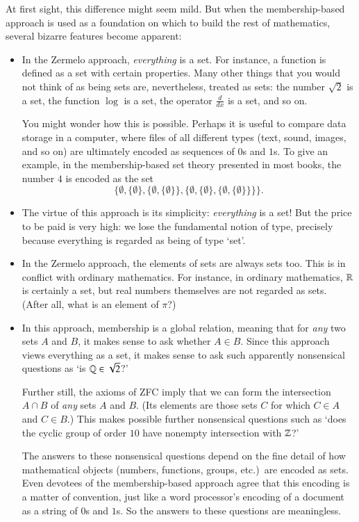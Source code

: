 At first sight, this difference might seem mild.  But when the
membership-based approach is used as a foundation on which to build the
rest of mathematics, several bizarre features become apparent:
%
\begin{itemize}
\item
In the Zermelo approach, \emph{everything} is a set.  For instance, a
function is defined as a set with certain properties.  Many other things
that you would not think of as being sets are, nevertheless, treated as
sets: the number $\sqrt{2}$ is a set, the function $\log$ is a set, the
operator $\frac{d}{dx}$ is a set, and so on.

You might wonder how this is possible.  Perhaps it is useful to compare
data storage in a computer,%
%
%
where files of all different types (text, sound, images, and so on) are
ultimately encoded as sequences of $0$s and $1$s.  To give an example, in
the membership-based set theory presented in most books, the number $4$ is
encoded as the set
\[
\{ \emptyset, \{ \emptyset \}, \{ \emptyset, \{ \emptyset \} \},
\{ \emptyset, \{ \emptyset \}, \{ \emptyset, \{ \emptyset \} \} \} \}.
\]

\item
The virtue of this approach is its simplicity: \emph{everything} is a set!
But the price to be paid is very high: we lose the fundamental notion of
type, precisely because everything is regarded as being of type `set'.

\item
In the Zermelo approach, the elements of sets are always sets too.  This
is in conflict%
%
%
with ordinary mathematics.  For instance, in ordinary mathematics, $\mathbb{R}$
is certainly a set, but real numbers themselves are not regarded as sets.
(After all, what is an element of $\pi$?)

\item
In this approach, membership is a global relation, meaning that for
\emph{any} two sets $A$ and $B$, it makes sense to ask whether $A \in B$.
Since this approach views everything as a set, it makes sense to ask such
apparently nonsensical questions as `is $\mathbb{Q} \in \sqrt{2}$?'

Further still, the axioms of ZFC imply that we can form the intersection $A
\cap B$ of \emph{any} sets $A$ and $B$.  (Its elements are those sets $C$
for which $C \in A$ and $C \in B$.)  This makes possible further
nonsensical questions such as `does the cyclic group of order $10$ have
nonempty intersection with $\mathbb{Z}$?'

The answers to these nonsensical questions depend on the fine detail of how
mathematical objects (numbers, functions, groups, etc.)\ are encoded as
sets.  Even devotees of the membership-based approach agree that this
encoding is a matter of convention, just like a word processor's encoding
of a document as a string of $0$s and $1$s.  So the answers to these
questions are meaningless.
\end{itemize}

